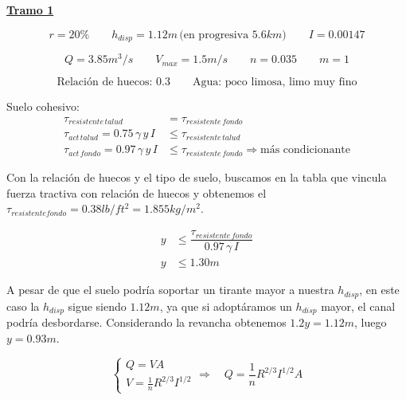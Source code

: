 \underline{\bf Tramo 1}

\begin{equation*}
  r = 20\%
 \qquad
  h_{disp} = 1.12 m \,\text{(en progresiva }5.6 km \text{)}
 \qquad
  I = 0.00147
\end{equation*}

\begin{equation*}
  Q = 3.85 m^3/s
 \qquad
  V_{max} = 1.5 m/s
 \qquad
  n = 0.035
 \qquad
  m = 1
\end{equation*}

\begin{equation*}
  \text{Relación de huecos: 0.3}
  \qquad
  \text{Agua: poco limosa, limo muy fino}
\end{equation*}

Suelo cohesivo:
\begin{align*}
 \tau_{resistente\,talud} &= \tau_{resistente\,fondo} \\
 \tau_{act\,talud} = 0.75 \, \gamma \, y \, I &\leq \tau_{resistente\,talud} \\
 \tau_{act\,fondo} = 0.97 \, \gamma \, y \, I &\leq \tau_{resistente\,fondo} \Longrightarrow \text{más condicionante}
\end{align*}

Con la relación de huecos y el tipo de suelo, buscamos en la tabla que vincula fuerza tractiva con relación de huecos y obtenemos
el $\tau_{resistente fondo} = 0.38 lb/ ft^2 = 1.855 kg/m^2$.

\begin{align*}
 y &\leq \dfrac{\tau_{resistente\,fondo}}{0.97 \, \gamma \, I} \\
 y &\leq 1.30 m
\end{align*}

A pesar de que el suelo podría soportar un tirante mayor a nuestra $h_{disp}$, en este caso la $h_{disp}$ sigue siendo $1.12 m$, ya que si adoptáramos 
un $h_{disp}$ mayor, el canal podría desbordarse.
Considerando la revancha obtenemos $1.2 y = 1.12 m$, luego $y = 0.93 m$.


\begin{equation*}
  \begin{cases}
    Q = V A \\
    V =  \frac{1}{n} R^{2/3} I^{1/2}
  \end{cases}
  \Longrightarrow \quad
  Q = \frac{1}{n} R^{2/3} I^{1/2} A
\end{equation*}



